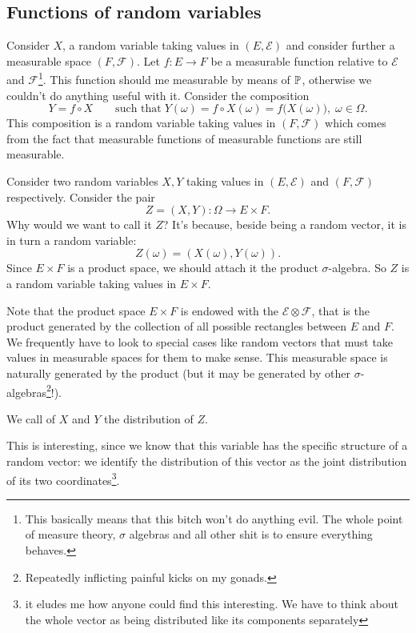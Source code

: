 \documentclass{report}
\begin{document}
\subsection{Functions of random variables}
Consider $X$, a random variable taking values in $(E,\mathscr{E})$ and consider further a measurable space $(F,\mathscr{F})$. Let $f:E\rightarrow F$ be a measurable function relative to $\mathscr{E}$ and $\mathscr{F}$\footnote{This basically means that this bitch won't do anything evil. The whole point of measure theory, $\sigma$ algebras and all other shit is to ensure everything behaves.}. This function should me measurable by means of $\mathbb{P}$, otherwise we couldn't do anything useful with it. Consider the composition
\[Y=f\circ X\qquad\text{such that}\;Y(\omega)=f\circ X(\omega)=f\big(X(\omega)\big),\;\omega\in\Omega.\]
This composition is a random variable taking values in $(F,\mathscr{F})$ which comes from the fact that measurable functions of measurable functions are still measurable. 
\begin{definition}
	Consider two random variables $X,Y$ taking values in $(E,\mathscr{E})$ and $(F,\mathscr{F})$ respectively. Consider the pair
	\[Z=(X,Y):\Omega\rightarrow E\times F.\]
	Why would we want to call it $Z$? It's because, beside being a random vector, it is in turn a random variable:
	\[Z(\omega)=(X(\omega),Y(\omega)).\]
	Since $E\times F$ is a product space, we should attach it the product $\sigma$-algebra. So $Z$ is a random variable taking values in $E\times F$. 
\end{definition}
Note that the product space $E\times F$ is endowed with the \sa $\mathscr{E}\otimes\mathscr{F}$, that is the product \sa generated by the collection of all possible rectangles between $E$ and $F$. We frequently have to look to special cases like random vectors that must take values in measurable spaces for them to make sense. This measurable space is naturally generated by the product \sa (but it may be generated by other $\sigma$-algebras\footnote{Repeatedly inflicting painful kicks on my gonads.}!).
\begin{definition}
	We call  of $X$ and $Y$ the distribution of $Z$. 
\end{definition}
This is interesting, since we know that this variable has the specific structure of a random vector: we identify the distribution of this vector as the joint distribution of its two coordinates\footnote{it eludes me how anyone could find this interesting. We have to think about the whole vector as being distributed like its components separately}. 
\end{document}
